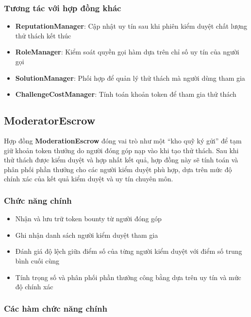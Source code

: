 \subsubsection{Tương tác với hợp đồng khác}

\begin{itemize}
  \item \textbf{ReputationManager}: Cập nhật uy tín sau khi phiên kiểm duyệt chất lượng thử thách kết thúc
  \item \textbf{RoleManager}: Kiểm soát quyền gọi hàm dựa trên chỉ số uy tín của người gọi
  \item \textbf{SolutionManager}: Phối hợp để quản lý thử thách mà người dùng tham gia
  \item \textbf{ChallengeCostManager}: Tính toán khoản token để tham gia thử thách
\end{itemize}

\subsection{ModeratorEscrow}

Hợp đồng \textbf{ModerationEscrow} đóng vai trò như một ``kho quỹ ký gửi'' để tạm giữ khoản token thưởng do người đóng góp nạp vào khi tạo thử thách.
Sau khi thử thách được kiểm duyệt và hợp nhất kết quả, hợp đồng này sẽ tính toán và phân phối phần thưởng cho các người kiểm duyệt phù hợp, dựa trên mức độ chính xác của kết quả kiểm duyệt và uy tín chuyên môn.

\subsubsection{Chức năng chính}

\begin{itemize}
  \item Nhận và lưu trữ token bounty từ người đóng góp
  \item Ghi nhận danh sách người kiểm duyệt tham gia
  \item Đánh giá độ lệch giữa điểm số của từng người kiểm duyệt với điểm số trung bình cuối cùng
  \item Tính trọng số và phân phối phần thưởng công bằng dựa trên uy tín và mức độ chính xác
\end{itemize}

\subsubsection{Các hàm chức năng chính}

